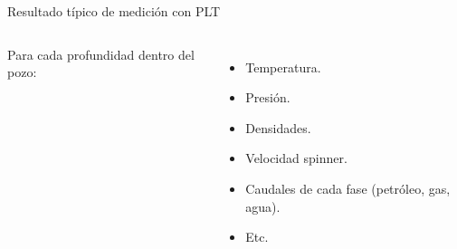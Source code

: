 \documentclass[presentation]{beamer}
\begin{document}
\begin{frame}{Resultado típico de medición con PLT}
\begin{columns}
		Para cada profundidad dentro del pozo:
		\begin{itemize}
			\item Temperatura.
			\item Presión.
			\item Densidades.
			\item Velocidad spinner.
			\item Caudales de cada fase (petróleo, gas, agua).
			\item Etc.
%			
		\end{itemize}
	\end{columns}
\end{frame}
\end{document}
